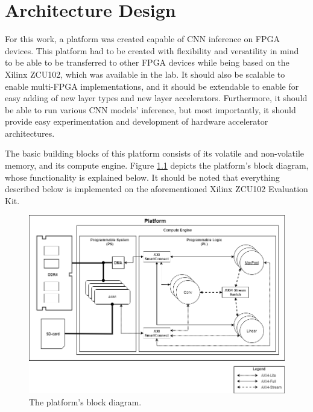 \chapter{Architecture Design}
\label{Chapter-Architecture-Design}

For this work, a platform was created capable of CNN inference on FPGA devices. This platform had to be created with flexibility and versatility in mind to be able to be transferred to other FPGA devices while being based on the Xilinx ZCU102, which was available in the lab. It should also be scalable to enable multi-FPGA implementations, and it should be extendable to enable for easy adding of new layer types and new layer accelerators. Furthermore, it should be able to run various CNN models' inference, but most importantly, it should provide easy experimentation and development of hardware accelerator architectures.

The basic building blocks of this platform consists of its volatile and non-volatile memory, and its compute engine. Figure \ref{fig:platform-block-diagram} depicts the platform's block diagram, whose functionality is explained below. It should be noted that everything described below is implemented on the aforementioned Xilinx ZCU102 Evaluation Kit.

\begin{figure} [H]
	\centering
	\includegraphics[width=\textwidth]{Images/Platform/platform.png}
	\decoRule
	\caption[The platform's block diagram]{The platform's block diagram.}
	\label{fig:platform-block-diagram}
\end{figure}

